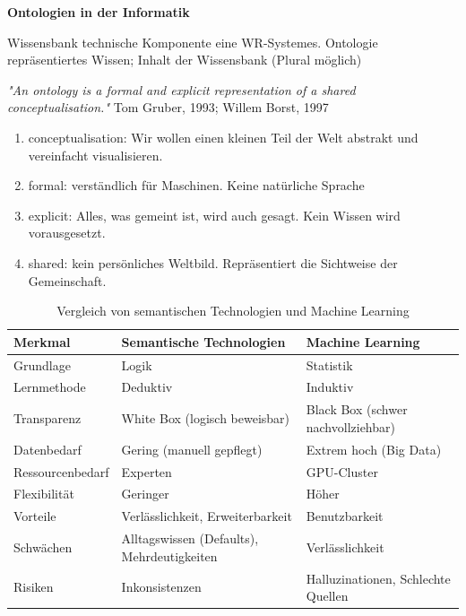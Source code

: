 \documentclass[a4paper]{article}
\begin{document}
\textbf{Ontologien in der Informatik}

Wissensbank technische Komponente eine WR-Systemes. Ontologie repräsentiertes Wissen; Inhalt der Wissensbank (Plural möglich)

\textit{"An ontology is a formal and explicit representation of a shared conceptualisation."} Tom Gruber, 1993; Willem Borst, 1997

\begin{enumerate}
    \item conceptualisation: Wir wollen einen kleinen Teil der Welt abstrakt und vereinfacht visualisieren.
    \item formal: verständlich für Maschinen. Keine natürliche Sprache
    \item explicit: Alles, was gemeint ist, wird auch gesagt. Kein Wissen wird vorausgesetzt.
    \item shared: kein persönliches Weltbild. Repräsentiert die Sichtweise der Gemeinschaft.
\end{enumerate}

\begin{table}[h]
    \centering
    \begin{tabularx}{\linewidth}{l|X|X}
        \textbf{Merkmal} & \textbf{Semantische Technologien} & \textbf{Machine Learning} \\ \hline\hline
        Grundlage & Logik & Statistik \\ \hline
        Lernmethode & Deduktiv & Induktiv \\ \hline
        Transparenz & White Box (logisch beweisbar) & Black Box (schwer nachvollziehbar) \\ \hline
        Datenbedarf & Gering (manuell gepflegt) & Extrem hoch (Big Data) \\ \hline
        Ressourcenbedarf & Experten & GPU-Cluster \\ \hline
        Flexibilität & Geringer & Höher \\ \hline
        Vorteile & Verlässlichkeit, Erweiterbarkeit & Benutzbarkeit \\ \hline
        Schwächen & Alltagswissen (Defaults), Mehrdeutigkeiten & Verlässlichkeit \\ \hline
        Risiken & Inkonsistenzen & Halluzinationen, Schlechte Quellen \\ \hline
    \end{tabularx}
    \caption{Vergleich von semantischen Technologien und Machine Learning}
\end{table}
\end{document}
